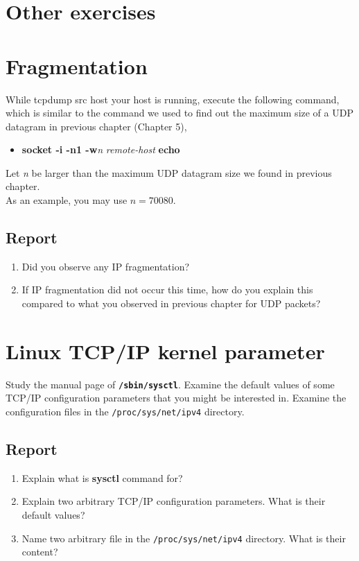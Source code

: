 \documentclass[10pt,a4paper]{article}
\numberwithin{equation}{section}
\numberwithin{figure}{section}
\numberwithin{table}{section}
\begin{document}
\section*{Other exercises}
\section{Fragmentation}
    While tcpdump src host your host is running, execute the following command, which is similar to the command we used to find out the maximum size of a UDP datagram in previous chapter (Chapter 5),
    \begin{itemize}
        \item \textbf{socket -i -n1 -w}\textit{n} \textit{remote-host} \textbf{echo} 
    \end{itemize}
    Let \textit{n} be larger than the maximum UDP datagram size we found in previous chapter. \\
    As an example, you may use $n = 70080$.
    \subsection*{Report}
    \begin{enumerate}
        \item Did you observe any IP fragmentation?
        \item If IP fragmentation did not occur this time, how do you explain this compared to what you observed in previous chapter for UDP packets?
    \end{enumerate}

\section{Linux TCP/IP kernel parameter}
    Study the manual page of \textbf{\texttt{/sbin/sysctl}}.
    Examine the default values of some TCP/IP configuration parameters that you might be interested in.
    Examine the configuration files in the \texttt{/proc/sys/net/ipv4} directory.
    \subsection*{Report}
    \begin{enumerate}
        \item Explain what is \textbf{sysctl} command for?
        \item Explain two arbitrary TCP/IP configuration parameters. What is their default values?
        \item Name two arbitrary file in the \texttt{/proc/sys/net/ipv4} directory. What is their content?
    \end{enumerate}
\end{document}
